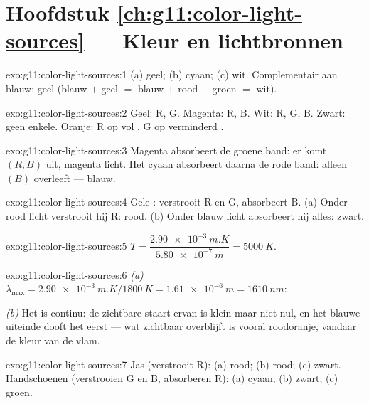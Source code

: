 \section*{Hoofdstuk \ref{ch:g11:color-light-sources} --- Kleur en lichtbronnen}

\begin{solution}{exo:g11:color-light-sources:1}
(a) geel; (b) cyaan; (c) wit. Complementair aan blauw: geel (blauw $+$
geel $=$ blauw $+$ rood $+$ groen $=$ wit).
\end{solution}

\begin{solution}{exo:g11:color-light-sources:2}
Geel: R, G. Magenta: R, B. Wit: R, G, B. Zwart: geen enkele. Oranje: R op
vol , G op verminderd .
\end{solution}

\begin{solution}{exo:g11:color-light-sources:3}
Magenta absorbeert de groene band: er komt $(R, B)$ uit, magenta licht.
Het cyaan  absorbeert daarna de rode band: alleen $(B)$ overleeft
--- blauw.
\end{solution}

\begin{solution}{exo:g11:color-light-sources:4}
Gele : verstrooit R en G, absorbeert B. (a) Onder rood licht
verstrooit hij R: rood. (b) Onder blauw licht absorbeert hij alles:
zwart.
\end{solution}

\begin{solution}{exo:g11:color-light-sources:5}
$T = \dfrac{\qty{2.90e-3}{m.K}}{\qty{5.80e-7}{m}} = \qty{5000}{K}$.
\end{solution}

\begin{solution}{exo:g11:color-light-sources:6}
\emph{(a)} $\lambda_{\max} = \qty{2.90e-3}{m.K}/\qty{1800}{K}
= \qty{1.61e-6}{m} = \qty{1610}{nm}$: .

\emph{(b)} Het  is continu: de zichtbare staart ervan is klein
maar niet nul, en het blauwe uiteinde dooft het eerst --- wat zichtbaar
overblijft is vooral roodoranje, vandaar de kleur van de vlam.
\end{solution}

\begin{solution}{exo:g11:color-light-sources:7}
Jas (verstrooit R): (a) rood; (b) rood; (c) zwart. Handschoenen
(verstrooien G en B, absorberen R): (a) cyaan; (b) zwart; (c) groen.
\end{solution}

